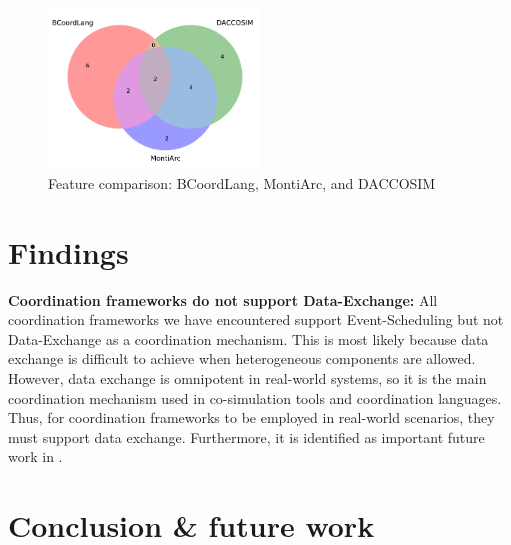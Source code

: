 \documentclass[runningheads]{llncs}
\begin{document}
\begin{figure}[ht]
	\centering
	\includegraphics[width=0.5\textwidth]{images/venn_daccosim}
	\caption{Feature comparison: BCoordLang, MontiArc, and DACCOSIM}
	\label{fig:venn-DACCOSIM}
\end{figure}


\section{Findings} \label{sec:findings}






\textbf{Coordination frameworks do not support Data-Exchange:} All coordination frameworks we have encountered support \textsf{Event-Scheduling} but not \textsf{Data-Exchange} as a coordination mechanism.
This is most likely because data exchange is difficult to achieve when heterogeneous components are allowed.
However, data exchange is omnipotent in real-world systems, so it is the main coordination mechanism used in co-simulation tools and coordination languages.
Thus, for coordination frameworks to be employed in real-world scenarios, they must support data exchange.
Furthermore, it is identified as important future work in \cite{krauterBehavioralConsistencyMultimodeling2023,varalarsenBCOolBehavioralCoordination2016}.

\section{Conclusion \& future work} \label{sec:conclusion}



\end{document}
